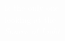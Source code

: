 \documentclass[preview,convert={density=600,outext=.png,command=\unexpanded{ {\convertexe\space -density \density\space\infile\space \ifx\size\empty\else -resize \size\fi\space -quality 90 -trim +repage -background "rgba(50,50,50,0.5)" -bordercolor "rgba(50,50,50,0.5)" -border 25 -flatten \outfile} } }]{standalone}
\begin{document}
\begin{center}
\textcolor{white}{ 
Is the only one \\
looking at the \\
\textit{Source of Light} \\
 \\ }
\end{center}
\end{document}
